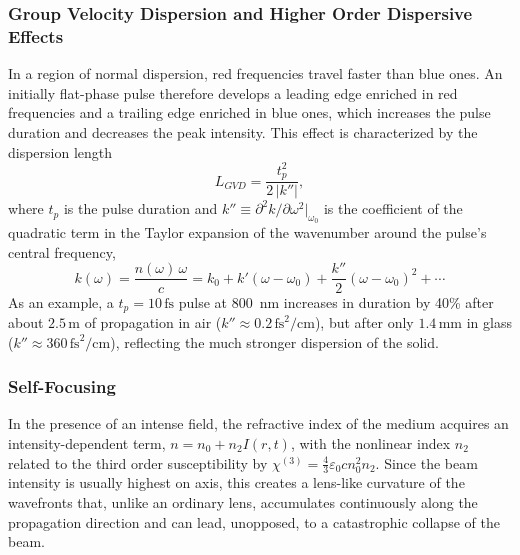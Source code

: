 \documentclass[11pt,a4paper]{article}
\begin{document}
\subsubsection{Group Velocity Dispersion and Higher Order Dispersive Effects}
In a region of normal dispersion, red frequencies travel faster than blue ones. An initially flat-phase pulse therefore develops a leading edge enriched in red frequencies and a trailing edge enriched in blue ones, which increases the pulse duration and decreases the peak intensity. This effect is characterized by the dispersion length
\begin{equation}
L_{GVD} = \frac{t_p^2}{2\,|k''|},
\end{equation}
where $t_p$ is the pulse duration and $k''\equiv \partial^2k/\partial\omega^2|_{\omega_0}$ is the coefficient of the quadratic term in the Taylor expansion of the wavenumber around the pulse's central frequency,
\begin{equation}
k(\omega) = \frac{n(\omega)\,\omega}{c} = k_0 + k'(\omega-\omega_0) + \frac{k''}{2}(\omega-\omega_0)^2 + \cdots
\end{equation}
As an example, a $t_p=10\,\text{fs}$ pulse at 800~nm increases in duration by 40\% after about $2.5\,\text{m}$ of propagation in air ($k''\approx0.2\,\text{fs}^2/\text{cm}$), but after only $1.4\,\text{mm}$ in glass ($k''\approx360\,\text{fs}^2/\text{cm}$), reflecting the much stronger dispersion of the solid.

\subsubsection{Self-Focusing}
In the presence of an intense field, the refractive index of the medium acquires an intensity-dependent term, $n=n_0+n_2I(r,t)$, with the nonlinear index $n_2$ related to the third order susceptibility by $\chi^{(3)}=\tfrac{4}{3}\varepsilon_0cn_0^2n_2$. Since the beam intensity is usually highest on axis, this creates a lens-like curvature of the wavefronts that, unlike an ordinary lens, accumulates continuously along the propagation direction and can lead, unopposed, to a catastrophic collapse of the beam.
\end{document}
